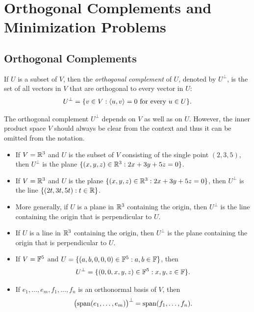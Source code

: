 \iftestbuild %
\setcounter{section}{2}\setcounter{theorem}{45}
\fi %
\DeclareRobustCommand\axeqstep[1]{\refstepcounter{theorem}\label{#1}}
\DeclareRobustCommand\axeqtag{\tag*{\thetheorem}}
\section{Orthogonal Complements and Minimization Problems}

\subsection{Orthogonal Complements}

\begin{definition}\label{ax:6.46}
If $U$ is a subset of $V$, then the \emph{orthogonal complement} of $U$, denoted
by $U^\perp$, is the set of all vectors in $V$ that are orthogonal to every
vector in $U$:
\[ U^\perp = \{v\in V : \langle u, v \rangle=0 \text{ for every } u\in U\}. \]
\end{definition}

The orthogonal complement $U^\perp$ depends on $V$ as well as on $U$. However,
the inner product space $V$ should always be clear from the context and thus it
can be omitted from the notation.

\begin{example}\label{ax:6.47}\leavevmode
\begin{itemize}
\item If $V=\mathbb{R}^3$ and $U$ is the subset of $V$ consisting of the single point
  $(2,3,5)$, then $U^\perp$ is the plane
  $\{(x,y,z)\in\mathbb{R}^3 : 2x+3y+5z=0\}$.
\item If $V=\mathbb{R}^3$ and $U$ is the plane $\{(x,y,z)\in\mathbb{R}^3 : 2x+3y+5z=0\}$, then
  $U^\perp$ is the line $\{(2t,3t,5t) : t\in\mathbb{R}\}$.
\item More generally, if $U$ is a plane in $\mathbb{R}^3$ containing the origin, then
  $U^\perp$ is the line containing the origin that is perpendicular to $U$.
\item If $U$ is a line in $\mathbb{R}^3$ containing the origin, then $U^\perp$ is the
  plane containing the origin that is perpendicular to $U$.
\item If $V=\mathbb{F}^5$ and $U=\{(a,b,0,0,0)\in\mathbb{F}^5 : a,b\in\mathbb{F}\}$, then
  \[ U^\perp = \{(0,0,x,y,z)\in\mathbb{F}^5 : x,y,z\in\mathbb{F}\}. \]
\item If $e_1,\dots,e_m,f_1,\dots,f_n$ is an orthonormal basis of $V$, then
  \[ \bigl(\operatorname{span}(e_1,\dots,e_m)\bigr)^\perp = \operatorname{span}(f_1,\dots,f_n). \]
\end{itemize}
\end{example}

